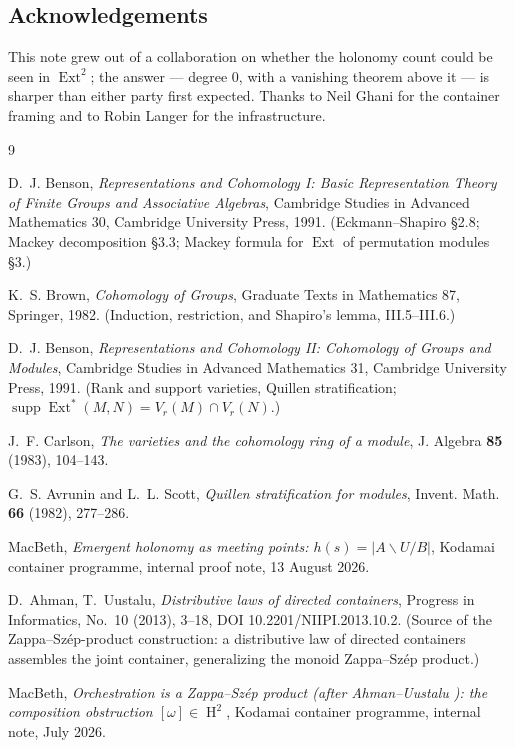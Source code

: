 \documentclass[11pt]{amsart}
\theoremstyle{plain}
\theoremstyle{definition}
\DeclareMathOperator{\Ext}{Ext}
\DeclareMathOperator{\Hh}{H}
\begin{document}
\subsection*{Acknowledgements}
This note grew out of a collaboration on whether the holonomy count could be seen in
$\Ext^2$; the answer --- degree $0$, with a vanishing theorem above it --- is sharper than
either party first expected. Thanks to Neil Ghani for the container framing and to Robin
Langer for the infrastructure.

\begin{thebibliography}{9}

D.~J. Benson,
\emph{Representations and Cohomology I: Basic Representation Theory of Finite Groups and
Associative Algebras},
Cambridge Studies in Advanced Mathematics 30, Cambridge University Press, 1991.
(Eckmann--Shapiro \S2.8; Mackey decomposition \S3.3; Mackey formula for $\Ext$ of
permutation modules \S3.)

K.~S. Brown,
\emph{Cohomology of Groups},
Graduate Texts in Mathematics 87, Springer, 1982. (Induction, restriction, and Shapiro's
lemma, III.5--III.6.)

D.~J. Benson,
\emph{Representations and Cohomology II: Cohomology of Groups and Modules},
Cambridge Studies in Advanced Mathematics 31, Cambridge University Press, 1991.
(Rank and support varieties, Quillen stratification; $\operatorname{supp}\Ext^*(M,N)=
V_r(M)\cap V_r(N)$.)

J.~F. Carlson,
\emph{The varieties and the cohomology ring of a module},
J. Algebra \textbf{85} (1983), 104--143.

G.~S. Avrunin and L.~L. Scott,
\emph{Quillen stratification for modules},
Invent. Math. \textbf{66} (1982), 277--286.

MacBeth,
\emph{Emergent holonomy as meeting points: $h(s)=\lvert A\backslash U/B\rvert$},
Kodamai container programme, internal proof note, 13 August 2026.

D.~Ahman, T.~Uustalu,
\emph{Distributive laws of directed containers},
Progress in Informatics, No.~10 (2013), 3--18, DOI 10.2201/NIIPI.2013.10.2.
(Source of the Zappa--Sz\'ep-product construction: a distributive law of directed
containers assembles the joint container, generalizing the monoid Zappa--Sz\'ep product.)

MacBeth,
\emph{Orchestration is a Zappa--Sz\'ep product \textnormal{(after Ahman--Uustalu
\cite{au-distlaw})}: the composition obstruction $[\omega]\in\Hh^2$},
Kodamai container programme, internal note, July 2026.


\end{thebibliography}
\end{document}
